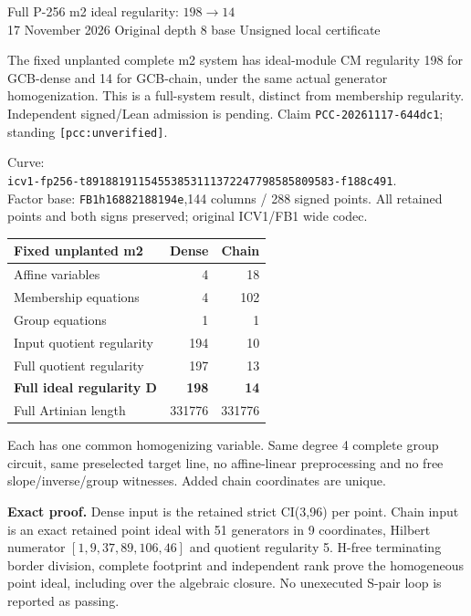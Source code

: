 \documentclass[10pt]{article}
\begin{document}
\begin{center}
{\Large Full P-256 m2 ideal regularity: $198\to14$}\\[4pt]
17 November 2026 \quad Original depth 8 base \quad Unsigned local certificate
\end{center}
The fixed unplanted complete m2 system has ideal-module CM regularity 198
for GCB-dense and 14 for GCB-chain, under the same actual generator
homogenization. This is a full-system result, distinct from membership
regularity. Independent signed/Lean admission is pending. Claim
\texttt{PCC-20261117-644dc1}; standing \texttt{[pcc:unverified]}.

Curve:\\
\texttt{icv1-fp256-t89188191154553853111372247798585809583-f188c491}.\\
Factor base: \texttt{FB1h16882188194e},144 columns / 288 signed points. All
retained points and both signs preserved; original ICV1/FB1 wide codec.

\begin{center}
\begin{tabular}{lrr}\toprule
Fixed unplanted m2 & Dense & Chain\\\midrule
Affine variables & 4 & 18\\
Membership equations & 4 & 102\\
Group equations & 1 & 1\\
Input quotient regularity & 194 & 10\\
Full quotient regularity & 197 & 13\\
\textbf{Full ideal regularity D} & \textbf{198} & \textbf{14}\\
Full Artinian length & 331776 & 331776\\\bottomrule
\end{tabular}
\end{center}
Each has one common homogenizing variable. Same degree 4 complete group
circuit, same preselected target line, no affine-linear preprocessing and
no free slope/inverse/group witnesses. Added chain coordinates are unique.

\textbf{Exact proof.} Dense input is the retained strict CI(3,96) per point.
Chain input is an exact retained point ideal with 51 generators in 9 coordinates,
Hilbert numerator $[1,9,37,89,106,46]$ and quotient regularity 5. H-free
terminating border division, complete footprint and independent rank prove
the homogeneous point ideal, including over the algebraic closure.
No unexecuted S-pair loop is reported as passing.
\end{document}
